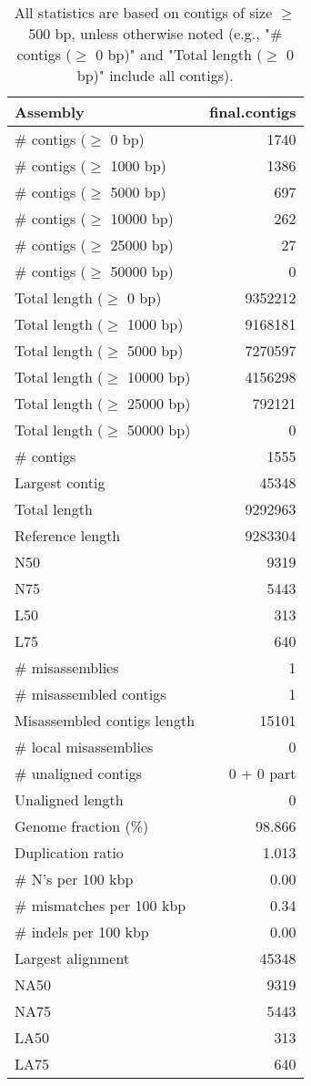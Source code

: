 \documentclass[12pt,a4paper]{article}
\begin{document}
\begin{table}[ht]
\begin{center}
\caption{All statistics are based on contigs of size $\geq$ 500 bp, unless otherwise noted (e.g., "\# contigs ($\geq$ 0 bp)" and "Total length ($\geq$ 0 bp)" include all contigs).}
\begin{tabular}{|l*{1}{|r}|}
\hline
Assembly & final.contigs \\ \hline
\# contigs ($\geq$ 0 bp) & 1740 \\ \hline
\# contigs ($\geq$ 1000 bp) & 1386 \\ \hline
\# contigs ($\geq$ 5000 bp) & 697 \\ \hline
\# contigs ($\geq$ 10000 bp) & 262 \\ \hline
\# contigs ($\geq$ 25000 bp) & 27 \\ \hline
\# contigs ($\geq$ 50000 bp) & 0 \\ \hline
Total length ($\geq$ 0 bp) & 9352212 \\ \hline
Total length ($\geq$ 1000 bp) & 9168181 \\ \hline
Total length ($\geq$ 5000 bp) & 7270597 \\ \hline
Total length ($\geq$ 10000 bp) & 4156298 \\ \hline
Total length ($\geq$ 25000 bp) & 792121 \\ \hline
Total length ($\geq$ 50000 bp) & 0 \\ \hline
\# contigs & 1555 \\ \hline
Largest contig & 45348 \\ \hline
Total length & 9292963 \\ \hline
Reference length & 9283304 \\ \hline
N50 & 9319 \\ \hline
N75 & 5443 \\ \hline
L50 & 313 \\ \hline
L75 & 640 \\ \hline
\# misassemblies & 1 \\ \hline
\# misassembled contigs & 1 \\ \hline
Misassembled contigs length & 15101 \\ \hline
\# local misassemblies & 0 \\ \hline
\# unaligned contigs & 0 + 0 part \\ \hline
Unaligned length & 0 \\ \hline
Genome fraction (\%) & 98.866 \\ \hline
Duplication ratio & 1.013 \\ \hline
\# N's per 100 kbp & 0.00 \\ \hline
\# mismatches per 100 kbp & 0.34 \\ \hline
\# indels per 100 kbp & 0.00 \\ \hline
Largest alignment & 45348 \\ \hline
NA50 & 9319 \\ \hline
NA75 & 5443 \\ \hline
LA50 & 313 \\ \hline
LA75 & 640 \\ \hline
\end{tabular}
\end{center}
\end{table}
\end{document}
